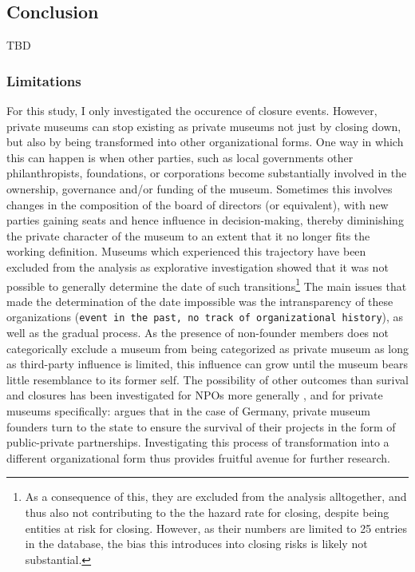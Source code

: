 \documentclass[12pt]{article}
\begin{document}
\subsection*{Conclusion}

TBD




\begin{sloppypar}
\printbibliography
\end{sloppypar}



\subsubsection*{Limitations}


For this study, I only investigated the occurence of closure events.
However, private museums can stop existing as private museums not just by closing down, but also by being transformed into other organizational forms.
One way in which this can happen is when other parties, such as local governments other philanthropists, foundations, or corporations become substantially involved in the ownership, governance and/or funding of the museum.
Sometimes this involves changes in the composition of the board of directors (or equivalent), with new parties gaining seats and hence influence in decision-making, thereby diminishing the private character of the museum to an extent that it no longer fits the working definition.
Museums which experienced this trajectory have been excluded from the analysis as explorative investigation showed that it was not possible to generally determine the date of such transitions\footnote{As a consequence of this, they are excluded from the analysis alltogether, and thus also not contributing to the the hazard rate for closing, despite being entities at risk for closing. However, as their numbers are limited to 25 entries in the database, the bias this introduces into closing risks is likely not substantial.}
The main issues that made the determination of the date impossible was the intransparency of these organizations (\texttt{event in the past, no track of organizational history}), as well as the gradual process.
As the presence of non-founder members does not categorically exclude a museum from being categorized as private museum as long as third-party influence is limited, this influence can grow until the museum bears little resemblance to its former self.
The possibility of other outcomes than surival and closures has been investigated for NPOs more generally
\parencite{Searing_2020_zombies,HernandezOrtiz_2022_discontinuity,Helmig_Ingerfurth_Pinz_2013_nonprofit}, and for private museums specifically: 
\textcite{Walker_2019_collector} argues that in the case of Germany, private museum founders turn to the state to ensure the survival of their projects in the form of public-private partnerships.
Investigating this process of transformation into a different organizational form thus provides fruitful avenue for further research. 
\end{document}

